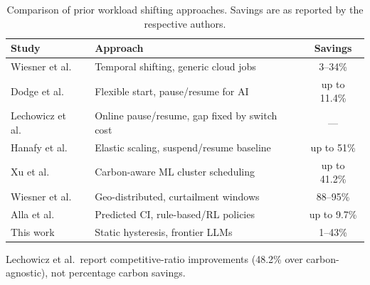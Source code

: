 \documentclass[runningheads]{llncs}
\begin{document}
\begin{table}[htb]
  \centering
  \begin{threeparttable}
    \caption{Comparison of prior workload shifting approaches. Savings
    are as reported by the respective authors.}
    \label{tab:prior}
    \small
    \begin{tabular}{@{}llc@{}}
      \toprule
      Study & Approach & Savings \\
      \midrule
      Wiesner et al.~\cite{wiesner_lets_2021}
      & Temporal shifting, generic cloud jobs
      & 3--34\% \\
      Dodge et al.~\cite{dodge_measuring_2022}
      & Flexible start, pause/resume for AI
      & up to 11.4\% \\
      Lechowicz et al.~\cite{lechowicz_pause_2023}
      & Online pause/resume, gap fixed by switch cost
      & ---\tnote{a} \\
      Hanafy et al.~\cite{hanafy_carbonscaler_2023}
      & Elastic scaling, suspend/resume baseline
      & up to 51\% \\
      Xu et al.~\cite{xu_green_2025}
      & Carbon-aware ML cluster scheduling
      & up to 41.2\% \\
      Wiesner et al.~\cite{wiesner_distributed_2026}
      & Geo-distributed, curtailment windows
      & 88--95\% \\
      Alla et al.~\cite{alla_ecoschedai_2026}
      & Predicted CI, rule-based/RL policies
      & up to 9.7\% \\
      This work
      & Static hysteresis, frontier LLMs
      & 1--43\% \\
      \bottomrule
    \end{tabular}
    \begin{tablenotes}
      \footnotesize
    \item[a] Lechowicz et al.\ report competitive-ratio improvements
      (48.2\% over carbon-agnostic), not percentage carbon savings.
    \end{tablenotes}
  \end{threeparttable}
\end{table}
\end{document}
